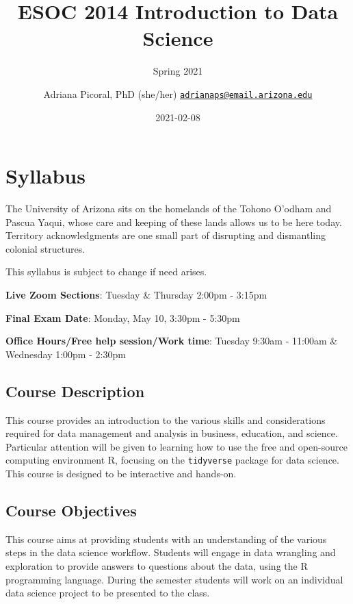 \documentclass[
]{book}
\title{ESOC 2014 Introduction to Data Science}
\subtitle{Spring 2021}
\author{Adriana Picoral, PhD (she/her) \href{mailto:adrianaps@email.arizona.edu}{\nolinkurl{adrianaps@email.arizona.edu}}}
\date{2021-02-08}
\begin{document}
\maketitle

{
\setcounter{tocdepth}{1}
\tableofcontents
}
\hypertarget{syllabus}{%
\chapter{Syllabus}\label{syllabus}}

The University of Arizona sits on the homelands of the Tohono O'odham and Pascua Yaqui, whose care and keeping of these lands allows us to be here today. Territory acknowledgments are one small part of disrupting and dismantling colonial structures.

This syllabus is subject to change if need arises.

\textbf{Live Zoom Sections}: Tuesday \& Thursday 2:00pm - 3:15pm

\textbf{Final Exam Date}: Monday, May 10, 3:30pm - 5:30pm

\textbf{Office Hours/Free help session/Work time}: Tuesday 9:30am - 11:00am \& Wednesday 1:00pm - 2:30pm

\hypertarget{course-description}{%
\section{Course Description}\label{course-description}}

This course provides an introduction to the various skills and considerations required for data management and analysis in business, education, and science. Particular attention will be given to learning how to use the free and open-source computing environment R, focusing on the \texttt{tidyverse} package for data science. This course is designed to be interactive and hands-on.

\hypertarget{course-objectives}{%
\section{Course Objectives}\label{course-objectives}}

This course aims at providing students with an understanding of the various steps in the data science workflow. Students will engage in data wrangling and exploration to provide answers to questions about the data, using the R programming language. During the semester students will work on an individual data science project to be presented to the class.
\end{document}
